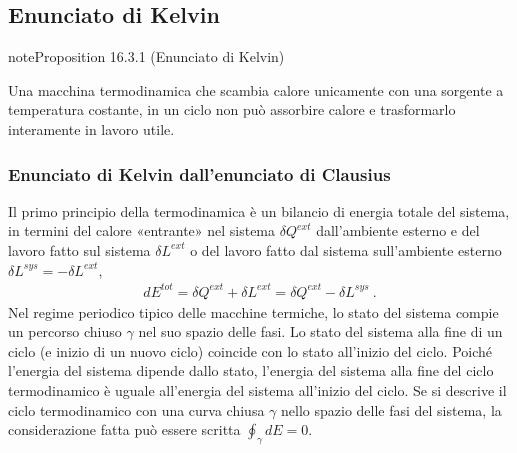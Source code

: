\documentclass[letterpaper,10pt,italian]{jupyterBook}
\begin{document}
\subsection{Enunciato di Kelvin}
\label{\detokenize{ch/thermodynamics/heat-engine-second-principle:enunciato-di-kelvin}}\label{\detokenize{ch/thermodynamics/heat-engine-second-principle:physics-hs-thermodynamics-heat-engine-second-principle-kelvin}}\label{ch/thermodynamics/heat-engine-second-principle:proposition-0}
\begin{sphinxadmonition}{note}{Proposition 16.3.1 (Enunciato di Kelvin)}



\sphinxAtStartPar
Una macchina termodinamica che scambia calore unicamente con una sorgente a temperatura costante, in un ciclo non può assorbire calore e trasformarlo interamente in lavoro utile.
\end{sphinxadmonition}
\subsubsection*{Enunciato di Kelvin dall’enunciato di Clausius}

\sphinxAtStartPar
Il primo principio della termodinamica è un bilancio di energia totale del sistema, in termini del calore «entrante» nel sistema \(\delta Q^{ext}\) dall’ambiente esterno e del lavoro fatto sul sistema \(\delta L^{ext}\) o del lavoro fatto dal sistema sull’ambiente esterno \(\delta L^{sys} = - \delta L^{ext}\),
\begin{equation*}
\begin{split}d E^{tot} = \delta Q^{ext} + \delta L^{ext} = \delta Q^{ext} - \delta L^{sys} \ .\end{split}
\end{equation*}
\sphinxAtStartPar
Nel regime periodico tipico delle macchine termiche, lo stato del sistema compie un percorso chiuso \(\gamma\) nel suo spazio delle fasi. Lo stato del sistema alla fine di un ciclo (e inizio di un nuovo ciclo) coincide con lo stato all’inizio del ciclo. Poiché l’energia del sistema dipende dallo stato, l’energia del sistema alla fine del ciclo termodinamico è uguale all’energia del sistema all’inizio del ciclo. Se si descrive il ciclo termodinamico con una curva chiusa \(\gamma\) nello spazio delle fasi del sistema, la considerazione fatta può essere scritta \(\oint_{\gamma} dE = 0\).
\end{document}

